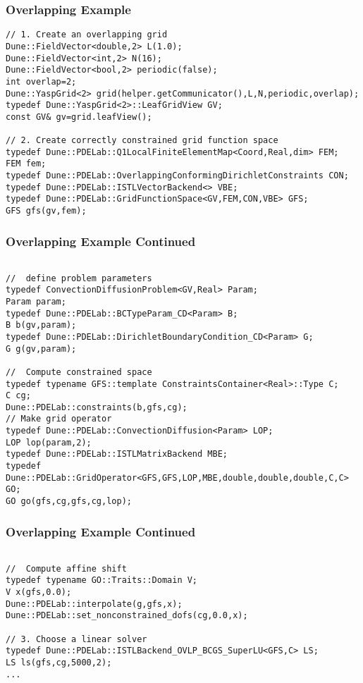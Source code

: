 \begin{frame}[fragile]
  \frametitle{Overlapping Example}
  \begin{lstlisting}
// 1. Create an overlapping grid
Dune::FieldVector<double,2> L(1.0);
Dune::FieldVector<int,2> N(16);
Dune::FieldVector<bool,2> periodic(false);
int overlap=2;
Dune::YaspGrid<2> grid(helper.getCommunicator(),L,N,periodic,overlap);
typedef Dune::YaspGrid<2>::LeafGridView GV;
const GV& gv=grid.leafView();

// 2. Create correctly constrained grid function space
typedef Dune::PDELab::Q1LocalFiniteElementMap<Coord,Real,dim> FEM;
FEM fem;
typedef Dune::PDELab::OverlappingConformingDirichletConstraints CON;
typedef Dune::PDELab::ISTLVectorBackend<> VBE;
typedef Dune::PDELab::GridFunctionSpace<GV,FEM,CON,VBE> GFS;
GFS gfs(gv,fem);

\end{lstlisting}
\end{frame}
\begin{frame}[fragile]
\frametitle<presentation>{Overlapping Example Continued}
  \begin{lstlisting}

//  define problem parameters
typedef ConvectionDiffusionProblem<GV,Real> Param;
Param param;
typedef Dune::PDELab::BCTypeParam_CD<Param> B;
B b(gv,param);
typedef Dune::PDELab::DirichletBoundaryCondition_CD<Param> G;
G g(gv,param);

//  Compute constrained space
typedef typename GFS::template ConstraintsContainer<Real>::Type C;
C cg;
Dune::PDELab::constraints(b,gfs,cg);
// Make grid operator
typedef Dune::PDELab::ConvectionDiffusion<Param> LOP;
LOP lop(param,2);
typedef Dune::PDELab::ISTLMatrixBackend MBE;
typedef Dune::PDELab::GridOperator<GFS,GFS,LOP,MBE,double,double,double,C,C> GO;
GO go(gfs,cg,gfs,cg,lop);

\end{lstlisting}
\end{frame}
\begin{frame}[fragile]
\frametitle<presentation>{Overlapping Example Continued}
  \begin{lstlisting}

//  Compute affine shift
typedef typename GO::Traits::Domain V;
V x(gfs,0.0);
Dune::PDELab::interpolate(g,gfs,x);
Dune::PDELab::set_nonconstrained_dofs(cg,0.0,x);

// 3. Choose a linear solver
typedef Dune::PDELab::ISTLBackend_OVLP_BCGS_SuperLU<GFS,C> LS;
LS ls(gfs,cg,5000,2);
...
\end{lstlisting}
\end{frame}


